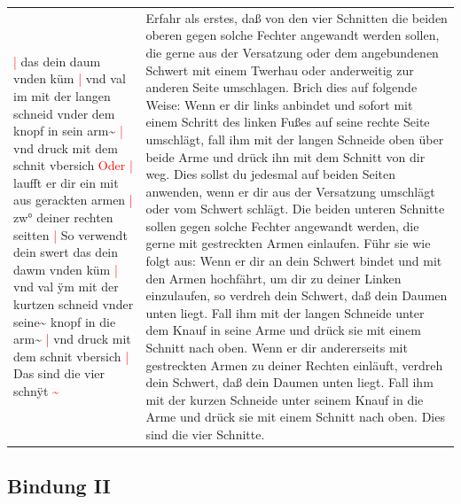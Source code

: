 \begin{longtable}{p{6.25cm}p{6.25cm}}
    \textcolor{red}{|} das dein daum vnden küm
    \textcolor{red}{|} vnd val im mit der langen schneid vnder dem knopf in sein arm\textasciitilde{}
    \textcolor{red}{|} vnd druck mit dem schnit vbersich \textcolor{red}{Oder}
    \textcolor{red}{|} laufft er dir ein mit aus gerackten armen
    \textcolor{red}{|} zw° deiner rechten seitten
    \textcolor{red}{|} So verwendt dein swert das dein dawm vnden küm
    \textcolor{red}{|} vnd val ÿm mit der kurtzen schneid vnder seine\textasciitilde{} knopf in die arm\textasciitilde{}
    \textcolor{red}{|} vnd druck mit dem schnit vbersich
    \textcolor{red}{|} Das sind die vier schnÿt \textcolor{red}{\textasciitilde{}}
    &
    Erfahr als erstes, daß von den vier Schnitten die beiden oberen gegen solche Fechter angewandt werden sollen, die gerne aus der Versatzung oder dem angebundenen Schwert mit einem Twerhau oder anderweitig zur anderen Seite umschlagen.
    Brich dies auf folgende Weise: Wenn er dir links anbindet und sofort mit einem Schritt des linken Fußes auf seine rechte Seite umschlägt, fall ihm mit der langen Schneide oben über beide Arme und drück ihn mit dem Schnitt von dir weg.
    Dies sollst du jedesmal auf beiden Seiten anwenden, wenn er dir aus der Versatzung umschlägt oder vom Schwert schlägt.
    Die beiden unteren Schnitte sollen gegen solche Fechter angewandt werden, die gerne mit gestreckten Armen einlaufen.
    Führ sie wie folgt aus: Wenn er dir an dein Schwert bindet und mit den Armen hochfährt, um dir zu deiner Linken einzulaufen, so verdreh dein Schwert, daß dein Daumen unten liegt.
    Fall ihm mit der langen Schneide unter dem Knauf in seine Arme und drück sie mit einem Schnitt nach oben.
    Wenn er dir andererseits mit gestreckten Armen zu deiner Rechten einläuft, verdreh dein Schwert, daß dein Daumen unten liegt.
    Fall ihm mit der kurzen Schneide unter seinem Knauf in die Arme und drück sie mit einem Schnitt nach oben.
    Dies sind die vier Schnitte.
\end{longtable}

\newpage

\begin{center}
\end{center}

\newpage

\subsection{Bindung II}
\label{sec:bindung2}

